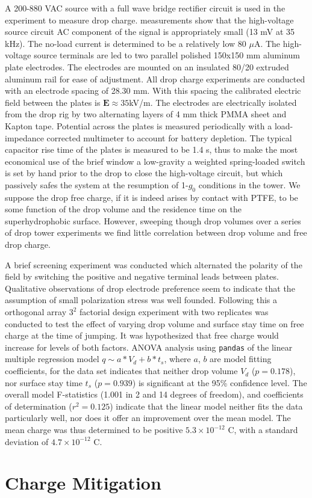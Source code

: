 \documentclass[12pt,a4paper,oneside]{book}
\begin{document}
A 200-880 VAC source with a full wave bridge rectifier circuit is used in the experiment to measure drop charge.  measurements show that the high-voltage source circuit AC component of the signal is appropriately small (13 mV at 35 kHz). The no-load current is determined to be a relatively low 80 $\mu$A. The high-voltage source terminals are led to two parallel polished 150x150 mm aluminum plate electrodes. The electrodes are mounted on an insulated 80/20 extruded aluminum rail for ease of adjustment. All drop charge experiments are conducted with an electrode spacing of 28.30 mm. With this spacing the calibrated electric field between the plates is $\mathbf{E} \approx 35$kV/m. The electrodes are electrically isolated from the drop rig by two alternating layers of 4 mm thick PMMA sheet and Kapton tape. Potential across the plates is measured periodically with a load-impedance corrected multimeter to account for battery depletion. The typical capacitor rise time of the plates is measured to be 1.4 s, thus to make the most economical use of the brief window a low-gravity a weighted spring-loaded switch is set by hand prior to the drop to close the high-voltage circuit, but which passively safes the system at the resumption of 1-$g_0$ conditions in the tower. We suppose the drop free charge, if it is indeed arises by contact with PTFE, to be some function of the drop volume and the residence time on the superhydrophobic surface. However, sweeping though drop volumes over a series of drop tower experiments we find little correlation between drop volume  and free drop charge.

A brief screening experiment was conducted which alternated the polarity of the field by switching the positive and negative terminal leads between plates. Qualitative observations of drop electrode preference seem to indicate that the assumption of small polarization stress was well founded. Following this a orthogonal array $3^2$ factorial design experiment with two replicates was conducted to test the effect of varying drop volume and surface stay time on free charge at the time of jumping. It was hypothesized that free charge would increase for levels of both factors. ANOVA analysis using \verb|pandas| of the linear multiple regression model $q \sim a*V_d + b*t_s$, where $a$, $b$ are model fitting coefficients, for the data set indicates that neither drop volume $V_d$ ($p=0.178$), nor surface stay time $t_s$ ($p=0.939$) is significant at the 95\% confidence level. The overall model F-statistics (1.001 in 2 and 14 degrees of freedom), and coefficients of determination ($r^2 = 0.125$) indicate that the linear model neither fits the data particularly well, nor does it offer an improvement over the mean model. The mean charge was thus determined to be positive $5.3 \times 10^{-12}$ C, with a standard deviation of $4.7 \times 10^{-12}$ C.

\chapter{Charge Mitigation}
\label{sec.mitigation}

\singlespacing
\backmatter
\printbibliography
\end{document}
